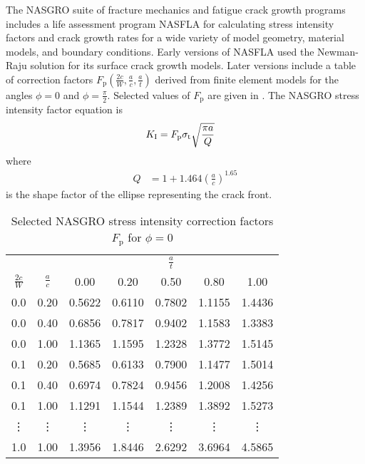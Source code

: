 The NASGRO suite of fracture mechanics and fatigue crack growth programs \citep{nasgro2000} includes a life assessment program NASFLA for calculating stress intensity factors and crack growth rates for a wide variety of model geometry, material models, and boundary conditions.
Early versions of NASFLA used the Newman-Raju solution for its surface crack growth models.
Later versions include a table of correction factors \(F_\text{p}(\frac{2c}{W}, \frac{a}{c}, \frac{a}{t})\) derived from finite element models for the angles \(\phi = 0\) and \(\phi =\frac{\pi}{2}\).
Selected values of \(F_\text{p}\) are given in .
The NASGRO stress intensity factor equation is
\begin{align}
K_\textnormal{I} &= F_\text{p} \sigma_{\textnormal{t}} \sqrt{\frac{\pi a}{Q}} \label{eq:nasgro-ki}
\end{align}
where
\begin{align}
Q &= 1 + 1.464 \left( \frac{a}{c} \right)^{1.65}
\end{align}
is the shape factor of the ellipse representing the crack front.
\begin{table}
\caption[Selected NASGRO stress intensity correction factors $F_\text{p}$ for $\phi=0$]{\label{tab:nasgro-c-tip} Selected NASGRO stress intensity correction factors $F_\text{p}$ for $\phi=0$ \citep{nasgro2000}}
\centering
\begin{tabular}	{ccccccc} \toprule
& & \multicolumn{5}{c}{\(\frac{a}{t}\)} \\ \cmidrule(lr){3-7}
\multicolumn{1}{c}{\(\frac{2c}{W}\)} & \multicolumn{1}{c}{\(\frac{a}{c}\)} & 0.00 & 0.20 & 0.50 & 0.80 & 1.00 \\ \midrule
0.0 & 0.20 & 0.5622 & 0.6110 & 0.7802 & 1.1155 & 1.4436 \\
0.0 & 0.40 & 0.6856 & 0.7817 & 0.9402 & 1.1583 & 1.3383 \\
0.0 & 1.00 & 1.1365 & 1.1595 & 1.2328 & 1.3772 & 1.5145 \\
0.1 & 0.20 & 0.5685 & 0.6133 & 0.7900 & 1.1477 & 1.5014 \\
0.1 & 0.40 & 0.6974 & 0.7824 & 0.9456 & 1.2008 & 1.4256 \\
0.1 & 1.00 & 1.1291 & 1.1544 & 1.2389 & 1.3892 & 1.5273 \\
\vdots & \vdots & \vdots & \vdots & \vdots & \vdots & \vdots \\
1.0 & 1.00 & 1.3956 & 1.8446 & 2.6292 & 3.6964 & 4.5865 \\ \bottomrule
\end{tabular}
\end{table}
